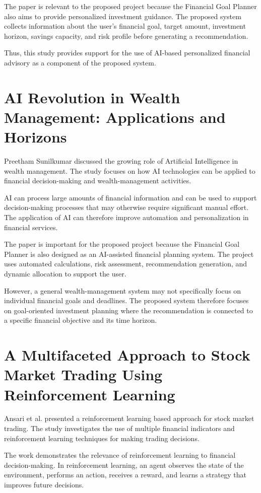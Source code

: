 The paper is relevant to the proposed project because the Financial Goal Planner also aims to provide personalized investment guidance. The proposed system collects information about the user's financial goal, target amount, investment horizon, savings capacity, and risk profile before generating a recommendation.

Thus, this study provides support for the use of AI-based personalized financial advisory as a component of the proposed system.

\section{AI Revolution in Wealth Management: Applications and Horizons}
Preetham Sunilkumar discussed the growing role of Artificial Intelligence in wealth management. The study focuses on how AI technologies can be applied to financial decision-making and wealth-management activities.

AI can process large amounts of financial information and can be used to support decision-making processes that may otherwise require significant manual effort. The application of AI can therefore improve automation and personalization in financial services.

The paper is important for the proposed project because the Financial Goal Planner is also designed as an AI-assisted financial planning system. The project uses automated calculations, risk assessment, recommendation generation, and dynamic allocation to support the user.

However, a general wealth-management system may not specifically focus on individual financial goals and deadlines. The proposed system therefore focuses on goal-oriented investment planning where the recommendation is connected to a specific financial objective and its time horizon.

\section{A Multifaceted Approach to Stock Market Trading Using Reinforcement Learning}
Ansari et al. presented a reinforcement learning based approach for stock market trading. The study investigates the use of multiple financial indicators and reinforcement learning techniques for making trading decisions.

The work demonstrates the relevance of reinforcement learning to financial decision-making. In reinforcement learning, an agent observes the state of the environment, performs an action, receives a reward, and learns a strategy that improves future decisions.

